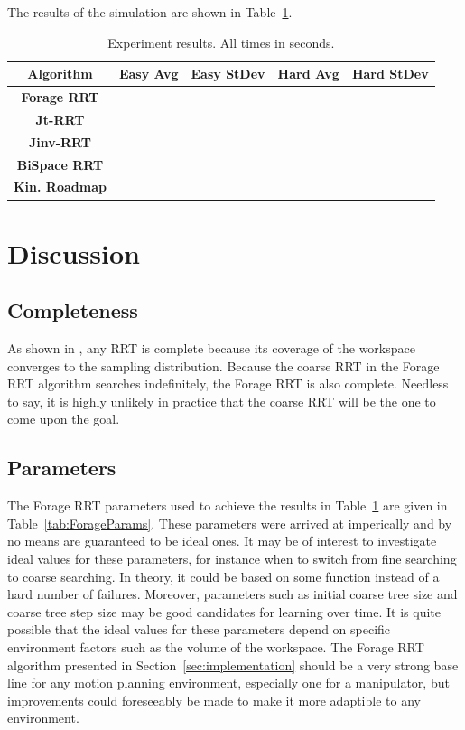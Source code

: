 \documentclass[conference]{IEEEtran}
\begin{document}
The results of the simulation are shown in Table~\ref{tab:Results}.

\begin{table}
        \centering
        \begin{tabular}{| c | c | c | c | c | }
		\hline
                Algorithm & \textbf{Easy Avg} & \textbf{Easy StDev} & \textbf{Hard Avg} & \textbf{Hard StDev}\\  \hline
                \textbf{Forage RRT}& & & & \\ \hline
                \textbf{Jt-RRT}& & & & \\ \hline
                \textbf{Jinv-RRT}& & & & \\ \hline
		\textbf{BiSpace RRT}& & & & \\ \hline
   		\textbf{Kin. Roadmap}& & & & \\ \hline
        \end{tabular}
        \caption{Experiment results. All times in seconds.}
        \label{tab:Results}
\end{table}

\section{Discussion}
\subsection{Completeness}
As shown in \cite{lavalle00}, any RRT is complete because its coverage of the workspace converges to the sampling distribution. Because the
coarse RRT in the Forage RRT algorithm searches indefinitely, the Forage RRT is also complete. Needless to say, it is highly unlikely in
practice that the coarse RRT will be the one to come upon the goal.

\subsection{Parameters}
The Forage RRT parameters used to achieve the results in Table~\ref{tab:Results} are given in Table~\ref{tab:ForageParams}. These parameters
were arrived at imperically and by no means are guaranteed to be ideal ones. It may be of interest to investigate ideal values for these
parameters, for instance when to switch from fine searching to coarse searching. In theory, it could be based on some function instead of a
hard number of failures. Moreover, parameters such as initial coarse tree size and coarse tree step size may be good candidates for learning
over time. It is quite possible that the ideal values for these parameters depend on specific environment factors such as the volume of the
workspace. The Forage RRT algorithm presented in Section~\ref{sec:implementation} should be a very strong base line for any motion planning
environment, especially one for a manipulator, but improvements could foreseeably be made to make it more adaptible to any environment.
\end{document}
